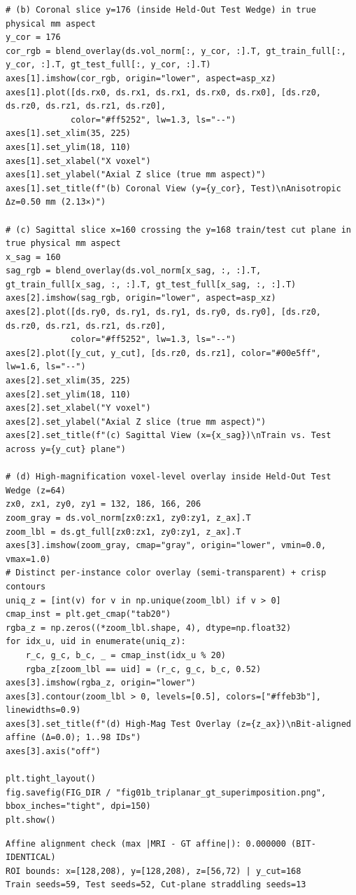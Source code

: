 \documentclass[10pt,a4paper]{article}
\renewcommand{\_}{\origunderscore\allowbreak}
\begin{document}
\begin{codebox}
\begin{lstlisting}[style=pybmed]
# (b) Coronal slice y=176 (inside Held-Out Test Wedge) in true physical mm aspect
y_cor = 176
cor_rgb = blend_overlay(ds.vol_norm[:, y_cor, :].T, gt_train_full[:, y_cor, :].T, gt_test_full[:, y_cor, :].T)
axes[1].imshow(cor_rgb, origin="lower", aspect=asp_xz)
axes[1].plot([ds.rx0, ds.rx1, ds.rx1, ds.rx0, ds.rx0], [ds.rz0, ds.rz0, ds.rz1, ds.rz1, ds.rz0],
             color="#ff5252", lw=1.3, ls="--")
axes[1].set_xlim(35, 225)
axes[1].set_ylim(18, 110)
axes[1].set_xlabel("X voxel")
axes[1].set_ylabel("Axial Z slice (true mm aspect)")
axes[1].set_title(f"(b) Coronal View (y={y_cor}, Test)\nAnisotropic Δz=0.50 mm (2.13×)")

# (c) Sagittal slice x=160 crossing the y=168 train/test cut plane in true physical mm aspect
x_sag = 160
sag_rgb = blend_overlay(ds.vol_norm[x_sag, :, :].T, gt_train_full[x_sag, :, :].T, gt_test_full[x_sag, :, :].T)
axes[2].imshow(sag_rgb, origin="lower", aspect=asp_xz)
axes[2].plot([ds.ry0, ds.ry1, ds.ry1, ds.ry0, ds.ry0], [ds.rz0, ds.rz0, ds.rz1, ds.rz1, ds.rz0],
             color="#ff5252", lw=1.3, ls="--")
axes[2].plot([y_cut, y_cut], [ds.rz0, ds.rz1], color="#00e5ff", lw=1.6, ls="--")
axes[2].set_xlim(35, 225)
axes[2].set_ylim(18, 110)
axes[2].set_xlabel("Y voxel")
axes[2].set_ylabel("Axial Z slice (true mm aspect)")
axes[2].set_title(f"(c) Sagittal View (x={x_sag})\nTrain vs. Test across y={y_cut} plane")

# (d) High-magnification voxel-level overlay inside Held-Out Test Wedge (z=64)
zx0, zx1, zy0, zy1 = 132, 186, 166, 206
zoom_gray = ds.vol_norm[zx0:zx1, zy0:zy1, z_ax].T
zoom_lbl = ds.gt_full[zx0:zx1, zy0:zy1, z_ax].T
axes[3].imshow(zoom_gray, cmap="gray", origin="lower", vmin=0.0, vmax=1.0)
# Distinct per-instance color overlay (semi-transparent) + crisp contours
uniq_z = [int(v) for v in np.unique(zoom_lbl) if v > 0]
cmap_inst = plt.get_cmap("tab20")
rgba_z = np.zeros((*zoom_lbl.shape, 4), dtype=np.float32)
for idx_u, uid in enumerate(uniq_z):
    r_c, g_c, b_c, _ = cmap_inst(idx_u % 20)
    rgba_z[zoom_lbl == uid] = (r_c, g_c, b_c, 0.52)
axes[3].imshow(rgba_z, origin="lower")
axes[3].contour(zoom_lbl > 0, levels=[0.5], colors=["#ffeb3b"], linewidths=0.9)
axes[3].set_title(f"(d) High-Mag Test Overlay (z={z_ax})\nBit-aligned affine (Δ=0.0); 1..98 IDs")
axes[3].axis("off")

plt.tight_layout()
fig.savefig(FIG_DIR / "fig01b_triplanar_gt_superimposition.png", bbox_inches="tight", dpi=150)
plt.show()
\end{lstlisting}
\end{codebox}
\begin{outbox}
\begin{lstlisting}[style=outbmed]
Affine alignment check (max |MRI - GT affine|): 0.000000 (BIT-IDENTICAL)
ROI bounds: x=[128,208), y=[128,208), z=[56,72) | y_cut=168
Train seeds=59, Test seeds=52, Cut-plane straddling seeds=13
\end{lstlisting}
\end{outbox}
\end{document}
